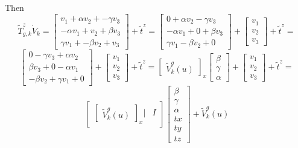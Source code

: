 \documentclass[12pt]{article}
\begin{document}
Then
\begin{equation}
\tilde{T}_{g,k}^{z} \dot{V}_{k}=
\begin{bmatrix}
         v_{1} +   \alpha v_{2} + - \gamma v_{3} \\
- \alpha v_{1} +          v_{2} +   \beta  v_{3}\\
  \gamma v_{1} + - \beta  v_{2} +          v_{3}
\end{bmatrix}
+ 
\tilde{t}^{z}  =
\begin{bmatrix}
            0  +   \alpha v_{2} -   \gamma v_{3} \\
- \alpha v_{1} +             0  +   \beta  v_{3} \\
  \gamma v_{1} -   \beta  v_{2} +             0
\end{bmatrix}
+ 
\begin{bmatrix} v_{1} \\ v_{2} \\ v_{3} \end{bmatrix} +
\tilde{t}^{z}  =
\end{equation}
\begin{equation}
\begin{bmatrix}
            0  - \gamma v_{3} + \alpha v_{2}  \\
  \beta  v_{3} +           0  - \alpha v_{1}  \\
- \beta  v_{2} + \gamma v_{1} +           0
\end{bmatrix}
+ 
\begin{bmatrix} v_{1} \\ v_{2} \\ v_{3} \end{bmatrix} +
\tilde{t}^{z}
=
\begin{bmatrix} \tilde{V}_{k}^{g}(u) \end{bmatrix}_{x} \begin{bmatrix} \beta \\ \gamma \\ \alpha \end{bmatrix}
+ 
\begin{bmatrix} v_{1} \\ v_{2} \\ v_{3} \end{bmatrix} +
\tilde{t}^{z}  =
\end{equation}
\begin{equation}
\left[
\begin{array}{cc}
\begin{bmatrix} \tilde{V}_{k}^{g}(u) \end{bmatrix}_{x} | & I 
\end{array}
\right]
\begin{bmatrix} \beta \\ \gamma \\ \alpha \\ tx \\ ty \\ tz \end{bmatrix} +
\tilde{V}_{k}^{g}(u)
\end{equation}
\end{document}
